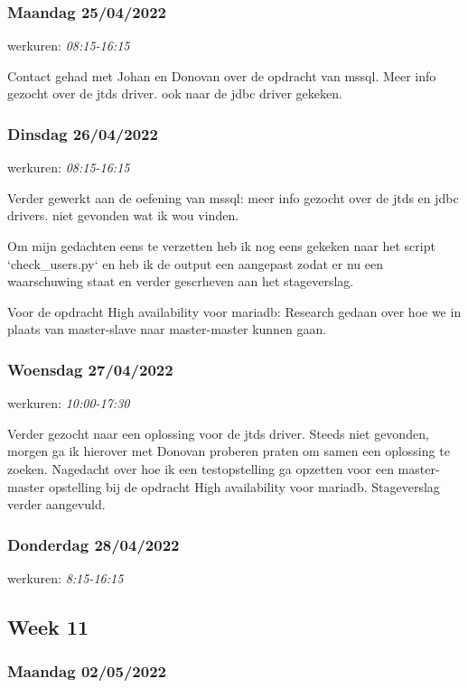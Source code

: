 \subsubsection{Maandag 25/04/2022}

werkuren: \emph{08:15-16:15}

Contact gehad met Johan en Donovan over de opdracht van \gls{mssql}. Meer info gezocht over de jtds driver. ook naar de jdbc driver gekeken.

\subsubsection{Dinsdag 26/04/2022}

werkuren: \emph{08:15-16:15}

Verder gewerkt aan de oefening van \gls{mssql}: meer info gezocht over de jtds en jdbc drivers. niet gevonden wat ik wou vinden.

Om mijn gedachten eens te verzetten heb ik nog eens gekeken naar het script `check_users.py` en heb ik de output een aangepast zodat er nu een waarschuwing staat en verder gescrheven aan het stageverslag.

Voor de opdracht High availability voor mariadb: Research gedaan over hoe we in plaats van master-slave naar master-master kunnen gaan.


\subsubsection{Woensdag 27/04/2022}

werkuren: \emph{10:00-17:30}

Verder gezocht naar een oplossing voor de jtds driver. Steeds niet gevonden, morgen ga ik hierover met Donovan proberen praten om samen een oplossing te zoeken.
Nagedacht over hoe ik een testopstelling ga opzetten voor een master-master opstelling bij de opdracht High availability voor mariadb.
Stageverslag verder aangevuld.

\subsubsection{Donderdag 28/04/2022}

werkuren: \emph{8:15-16:15}

\subsection{Week 11}

\subsubsection{Maandag 02/05/2022}


